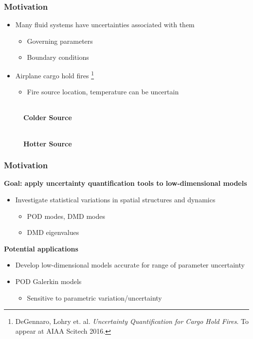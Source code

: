 \documentclass[9pt]{beamer}
\begin{document}
\begin{frame}
\frametitle{Motivation}
\label{sec-1-2}

\begin{itemize}
\item Many fluid systems have uncertainties associated with them
\begin{itemize}
\item Governing parameters
\item Boundary conditions
\end{itemize}
\item Airplane cargo hold fires \footnote{DeGennaro, Lohry et. al. \emph{Uncertainty Quantification for Cargo Hold Fires}. To appear at AIAA Scitech 2016.
 }
\begin{itemize}
\item Fire source location, temperature can be uncertain
\end{itemize}
\end{itemize}
\begin{figure}[ht]
\centering
\begin{minipage}[b]{0.45\linewidth}
 \\
\centering
\textbf{Colder Source} \\
\end{minipage}
\begin{minipage}[b]{0.45\linewidth}
 \\
\centering
\textbf{Hotter Source}
\end{minipage}
\end{figure}
\end{frame}
\begin{frame}
\frametitle{Motivation}
\label{sec-1-3}

\textbf{Goal: apply uncertainty quantification tools to low-dimensional models}
\begin{itemize}
\item Investigate statistical variations in spatial structures and dynamics
\begin{itemize}
\item POD modes, DMD modes
\item DMD eigenvalues
\end{itemize}
\end{itemize}
\textbf{Potential applications}
\begin{itemize}
\item Develop low-dimensional models accurate for range of parameter uncertainty
\item POD Galerkin models
\begin{itemize}
\item Sensitive to parametric variation/uncertainty
\end{itemize}
\end{itemize}
\end{frame}
\end{document}
